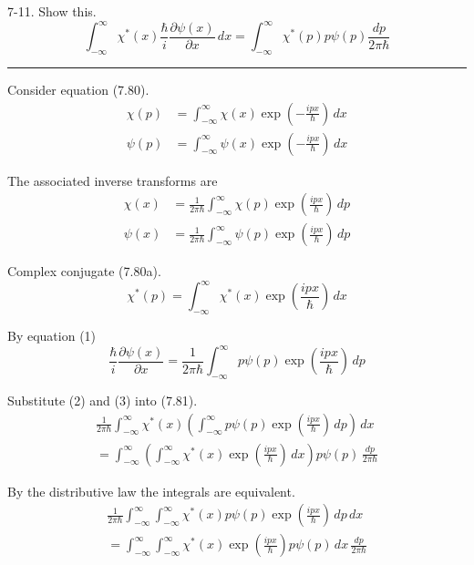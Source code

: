 \documentclass[12pt]{article}
\begin{document}
7-11.
Show this.
\begin{equation*}
\int_{-\infty}^\infty
\chi^*(x)\frac{\hbar}{i}\frac{\partial\psi(x)}{\partial x}\,dx
=\int_{-\infty}^\infty
\chi^*(p)p\psi(p)\frac{dp}{2\pi\hbar}
\tag{7.81}
\end{equation*}

\bigskip
\hrule

\bigskip
Consider equation (7.80).
\begin{align*}
\chi(p)&=\int_{-\infty}^\infty\chi(x)\exp\left(-\frac{ipx}{\hbar}\right)\,dx
\tag{7.80a}
\\
\psi(p)&=\int_{-\infty}^\infty\psi(x)\exp\left(-\frac{ipx}{\hbar}\right)\,dx
\tag{7.80b}
\end{align*}

The associated inverse transforms are
\begin{align*}
\chi(x)&=\frac{1}{2\pi\hbar}\int_{-\infty}^\infty\chi(p)\exp\left(\frac{ipx}{\hbar}\right)\,dp
\\
\psi(x)&=\frac{1}{2\pi\hbar}\int_{-\infty}^\infty\psi(p)\exp\left(\frac{ipx}{\hbar}\right)\,dp
\tag{1}
\end{align*}

Complex conjugate (7.80a).
\begin{equation*}
\chi^*(p)=\int_{-\infty}^\infty\chi^*(x)\exp\left(\frac{ipx}{\hbar}\right)\,dx
\tag{2}
\end{equation*}

By equation (1)
\begin{equation*}
\frac{\hbar}{i}\frac{\partial\psi(x)}{\partial x}=
\frac{1}{2\pi\hbar}\int_{-\infty}^\infty p\psi(p)\exp\left(\frac{ipx}{\hbar}\right)\,dp
\tag{3}
\end{equation*}

Substitute (2) and (3) into (7.81).
\begin{multline*}
\frac{1}{2\pi\hbar}\int_{-\infty}^\infty
\chi^*(x)
\left(\int_{-\infty}^\infty p\psi(p)\exp\left(\frac{ipx}{\hbar}\right)\,dp\right)
\,dx
\\
=\int_{-\infty}^\infty
\left(\int_{-\infty}^\infty\chi^*(x)\exp\left(\frac{ipx}{\hbar}\right)\,dx\right)
p\psi(p)\,\frac{dp}{2\pi\hbar}
\end{multline*}

By the distributive law the integrals are equivalent.
\begin{multline*}
\frac{1}{2\pi\hbar}\int_{-\infty}^\infty\int_{-\infty}^\infty
\chi^*(x)
p\psi(p)\exp\left(\frac{ipx}{\hbar}\right)
\,dp\,dx
\\
=\int_{-\infty}^\infty\int_{-\infty}^\infty
\chi^*(x)\exp\left(\frac{ipx}{\hbar}\right)
p\psi(p)
\,dx\,\frac{dp}{2\pi\hbar}
\end{multline*}
\end{document}

